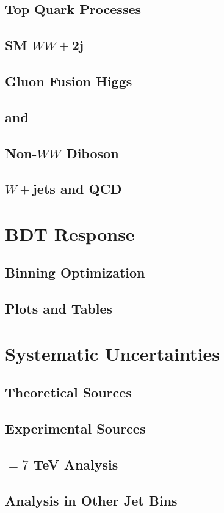 \subsection{Top Quark Processes}



\subsection{SM $WW+$2j}

\subsection{Gluon Fusion Higgs}

\subsection{\ZDYll and \Ztautau}

\subsection{Non-$WW$ Diboson}

\subsection{$W+$jets and QCD}

\section{BDT Response}

\subsection{Binning Optimization}

\subsection{Plots and Tables}

\section{Systematic Uncertainties}

\subsection{Theoretical Sources}

\subsection{Experimental Sources}

\subsection{\sqrts$=7$ TeV Analysis}

\subsection{\hwwlnln Analysis in Other Jet Bins}




